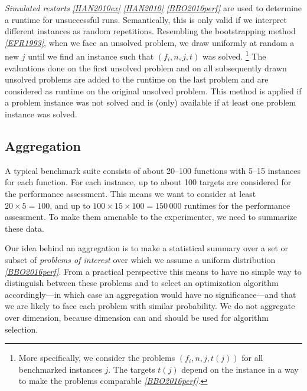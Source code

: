 \documentclass[letterpaper,12pt,english]{article}
\begin{document}
\emph{Simulated restarts} \label{index:id40}{\hyperref[index:han2010ex]{\emph{{[}HAN2010ex{]}}}} \label{index:id41}{\hyperref[index:han2010]{\emph{{[}HAN2010{]}}}} \label{index:id42}{\hyperref[index:bbo2016perf]{\emph{{[}BBO2016perf{]}}}} are used to determine a runtime for unsuccessful runs. Semantically, this is only valid if we interpret different
instances as random repetitions.
Resembling the bootstrapping method \label{index:id43}{\hyperref[index:efr1993]{\emph{{[}EFR1993{]}}}}, when we face an unsolved problem, we draw uniformly at random a
new \(j\) until we find an instance such that \((f_i, n, j, t)\) was solved. \footnote[13]{
More specifically, we consider the problems \((f_i, n, j, t(j))\) for
all benchmarked instances \(j\). The targets \(t(j)\) depend on the instance
in a way to make the problems comparable \label{index:id47}{\hyperref[index:bbo2016perf]{\emph{{[}BBO2016perf{]}}}}.
}
The evaluations done on the first unsolved problem and on all subsequently
drawn unsolved problems are added to the runtime on the last problem and
are considered as runtime on the original unsolved problem.
This method is applied if a problem instance was not solved and is
(only) available if at least one problem instance was solved.


\subsection{Aggregation}
\label{index:aggregation}
A typical benchmark suite consists of about 20--100 functions with 5--15 instances for each function. For each instance, up to about 100 targets are considered for the
performance assessment. This means we want to consider at least \(20\times5=100\), and
up to \(100\times15\times100=150\,000\) runtimes for the performance assessment.
To make them amenable to the experimenter, we need to summarize these data.

Our idea behind an aggregation is to make a statistical summary over a set or
subset of \emph{problems of interest} over which we assume a uniform distribution \label{index:id48}{\hyperref[index:bbo2016perf]{\emph{{[}BBO2016perf{]}}}}.
From a practical perspective this means to have no simple way to distinguish
between these problems and to select an optimization algorithm accordingly---in
which case an aggregation would have no significance---and that we are likely
to face each problem with similar probability.
We do not aggregate over dimension, because dimension can and
should be used for algorithm selection.
\end{document}

